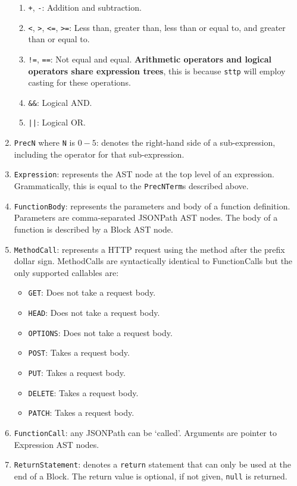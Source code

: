 \begin{enumerate}
\begin{enumerate}
        \item \verb|+|, \verb|-|: Addition and subtraction.
        \item \verb|<|, \verb|>|, \verb|<=|, \verb|>=|: Less than, greater than, less than or equal to, and greater than or equal to.
        \item \verb|!=|, \verb|==|: Not equal and equal. \textbf{Arithmetic operators and logical operators share expression trees}, this is because \verb|sttp| will employ casting for these operations.
        \item \verb|&&|: Logical AND.
        \item \verb+||+: Logical OR.
    \end{enumerate}
    \item \verb|PrecN| where \verb|N| is $0-5$: denotes the right-hand side of a sub-expression, including the operator for that sub-expression.
    \item \verb|Expression|: represents the AST node at the top level of an expression. Grammatically, this is equal to the \verb|PrecNTerm|s described above.
    \item \verb|FunctionBody|: represents the parameters and body of a function definition. Parameters are comma-separated JSONPath AST nodes. The body of a function is described by a Block AST node.
    \item \verb|MethodCall|: represents a HTTP request using the method after the prefix dollar sign. MethodCalls are syntactically identical to FunctionCalls but the only supported callables are:
    \begin{itemize}
        \item \verb|GET|: Does not take a request body.
        \item \verb|HEAD|: Does not take a request body.
        \item \verb|OPTIONS|: Does not take a request body.
        \item \verb|POST|: Takes a request body.
        \item \verb|PUT|: Takes a request body.
        \item \verb|DELETE|: Takes a request body.
        \item \verb|PATCH|: Takes a request body.
    \end{itemize}
    \item \verb|FunctionCall|: any JSONPath can be `called'. Arguments are pointer to Expression AST nodes.
    \item \verb|ReturnStatement|: denotes a \verb|return| statement that can only be used at the end of a Block. The return value is optional, if not given, \verb|null| is returned.

\end{enumerate}
